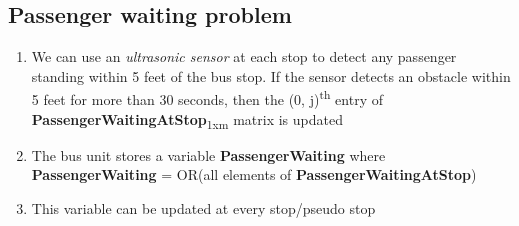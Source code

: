 \subsection{Passenger waiting problem}

\begin{enumerate}

    \item We can use an \textit{\gls{ultrasonic sensor}} at each stop to detect any passenger standing within 5 feet of the bus stop. If the sensor detects an obstacle within 5 feet for more than 30 seconds, then the (0, j)\textsuperscript{th} entry of \textbf{PassengerWaitingAtStop}\textsubscript{1xm} matrix is updated
    \item The bus unit stores a variable \textbf{PassengerWaiting} where\\
          \textbf{PassengerWaiting} = OR(all elements of \textbf{PassengerWaitingAtStop})
    \item This variable can be updated at every stop/pseudo stop

\end{enumerate}